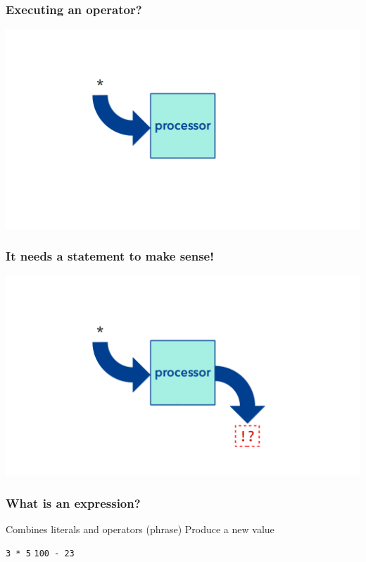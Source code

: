 \documentclass[11pt]{beamer}
\begin{document}
\begin{frame}
  \frametitle{Executing an operator?}
  \includegraphics[width=\textwidth]{./img/computer-operator-0.png}
\end{frame}

\begin{frame}
  \frametitle{It needs a statement to make sense!}
  \includegraphics[width=\textwidth]{./img/computer-operator-1.png}
\end{frame}

\begin{frame}
  \frametitle{What is an \textbf{expression}?}
  \Enlarge

  \begin{itemize}
  \myitem  Combines literals and operators (phrase) \pause
  \myitem  Produce a new value
    \begin{itemize}
    \mysubitem  \texttt{3 * 5}
    \mysubitem  \texttt{100 - 23}
    \end{itemize}
  \end{itemize}
\end{frame}
\end{document}
